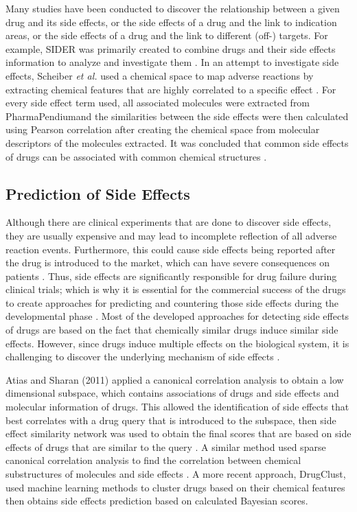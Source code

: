 Many studies have been conducted to discover the relationship between a given drug and its side effects, or the side effects of a drug and the link to indication areas, or the side effects of a drug and the link to different (off-) targets.
For example, \ac{SIDER} was primarily created to combine drugs and their side effects information to analyze and investigate them \cite{kuhn_side_2010}.
In an attempt to investigate side effects, Scheiber \textit{et al.} used a chemical space to map adverse reactions by extracting chemical features that are highly correlated to a specific effect \cite{scheiber_mapping_2009}.
For every side effect term used, all associated molecules were extracted from PharmaPendium\footnotemark and the similarities between the side effects were then calculated using Pearson correlation after creating the chemical space from molecular descriptors of the molecules extracted.
It was concluded that common side effects of drugs can be associated with common chemical structures \cite{scheiber_mapping_2009}.

\subsection{Prediction of Side Effects}

Although there are clinical experiments that are done to discover side effects, they are usually expensive and may lead to incomplete reflection of all adverse reaction events.
Furthermore, this could cause side effects being reported after the drug is introduced to the market, which can have severe consequences on patients \cite{dimitri_drugclust:_2017}.
Thus, side effects are significantly responsible for drug failure during clinical trials; which is why it is essential for the commercial success of the drugs to create approaches for predicting and countering those side effects during the developmental phase \cite{mizutani_relating_2012}.
Most of the developed approaches for detecting side effects of drugs are based on the fact that chemically similar drugs induce similar side effects.
However, since drugs induce multiple effects on the biological system, it is challenging to discover the underlying mechanism of side effects \cite{dimitri_drugclust:_2017}.

Atias and Sharan (2011) applied a canonical correlation analysis to obtain a low dimensional subspace, which contains associations of drugs and side effects and molecular information of drugs.
This allowed the identification of side effects that best correlates with a drug query that is introduced to the subspace, then side effect similarity network was used to obtain the final scores that are based on side effects of drugs that are similar to the query \cite{atias_algorithmic_2011}.
A similar method used sparse canonical correlation analysis to find the correlation between chemical substructures of molecules and side effects \cite{pauwels_predicting_2011}.
A more recent approach, DrugClust, used machine learning methods to cluster drugs based on their chemical features then obtains side effects prediction based on calculated Bayesian scores\cite{dimitri_drugclust:_2017}.

